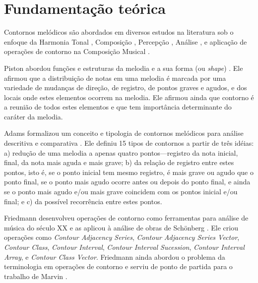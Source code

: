 \documentclass[12pt]{article}
\newcommand{\eng}[1]{\textit{#1}}
\begin{document}
\section{Fundamentação teórica}
\label{sec:fund-teor}


Contornos melódicos são abordados em diversos estudos na literatura
sob o enfoque da Harmonia Tonal \cite{piston59:harmony}, Composição
\cite{schoenberg67:fundamentals,toch77:shaping}, Percepção
\cite{edworthy85:musical,dewitt.ea86:recognition}, Análise
\cite{adams76:melodic,friedmann85:methodology,friedmann87:response,marvin.ea87:relating,marvin88:generalized,marvin91:perception,marvin.ea95:generalization,morris87:composition,morris93:directions,morris95:compositional,clifford95:contour,beard03:contour,bor09:contour,schultz08:melodic,schultz09:diachronic},
e aplicação de operações de contorno na Composição Musical
\cite{sampaio08:em}.



Piston abordou funções e estruturas da melodia e a sua forma (ou
\eng{shape}) \cite{piston59:harmony}. Ele afirmou que a distribuição
de notas em uma melodia é marcada por uma variedade de mudanças de
direção, de registro, de pontos graves e agudos, e dos locais onde
estes elementos ocorrem na melodia. Ele afirmou ainda que contorno é a
reunião de todos estes elementos e que tem importância determinante do
caráter da melodia.



Adams formalizou um conceito e tipologia de contornos melódicos para
análise descritiva e comparativa \cite{adams76:melodic}. Ele definiu
15 tipos de contornos a partir de três idéias: a) redução de uma
melodia a apenas quatro pontos---registro da nota inicial, final, da
nota mais aguda e mais grave; b) da relação de registro entre estes
pontos, isto é, se o ponto inicial tem mesmo registro, é mais grave ou
agudo que o ponto final, se o ponto mais agudo ocorre antes ou depois
do ponto final, e ainda se o ponto mais agudo e/ou mais grave
coincidem com os pontos inicial e/ou final; e c) da possível
recorrência entre estes pontos.


Friedmann desenvolveu operações de contorno como ferramentas para
análise de música do século XX e as aplicou à análise de obras de
Schönberg \cite{friedmann85:methodology}. Ele criou operações como
\eng{Contour Adjacency Series}, \eng{Contour Adjacency Series Vector},
\eng{Contour Class}, \eng{Contour Interval}, \eng{Contour Interval
  Sucession}, \eng{Contour Interval Array}, e \eng{Contour Class
  Vector}. Friedmann ainda abordou o problema da terminologia em
operações de contorno \cite{friedmann87:response} e serviu de ponto de
partida para o trabalho de Marvin \cite{marvin88:generalized}.
\end{document}
